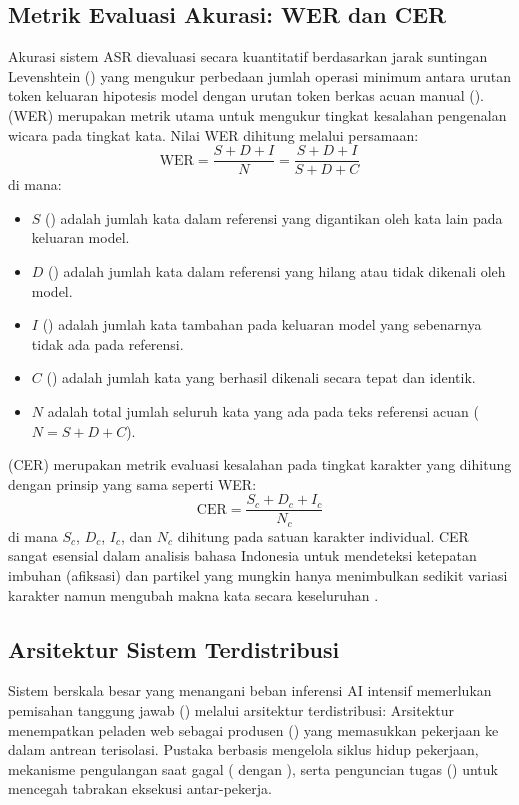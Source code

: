 \subsection{Metrik Evaluasi Akurasi: WER dan CER}
Akurasi sistem ASR dievaluasi secara kuantitatif berdasarkan jarak suntingan Levenshtein () yang mengukur perbedaan jumlah operasi minimum antara urutan token keluaran hipotesis model dengan urutan token berkas acuan manual ().
 (WER) merupakan metrik utama untuk mengukur tingkat kesalahan pengenalan wicara pada tingkat kata. Nilai WER dihitung melalui persamaan:
    \begin{equation}
        \text{WER} = \frac{S + D + I}{N} = \frac{S + D + I}{S + D + C}
    \end{equation}
    di mana:
    \begin{itemize}[leftmargin=1cm]
        \item $S$ () adalah jumlah kata dalam referensi yang digantikan oleh kata lain pada keluaran model.
        \item $D$ () adalah jumlah kata dalam referensi yang hilang atau tidak dikenali oleh model.
        \item $I$ () adalah jumlah kata tambahan pada keluaran model yang sebenarnya tidak ada pada referensi.
        \item $C$ () adalah jumlah kata yang berhasil dikenali secara tepat dan identik.
        \item $N$ adalah total jumlah seluruh kata yang ada pada teks referensi acuan ($N = S + D + C$).
    \end{itemize}
 (CER) merupakan metrik evaluasi kesalahan pada tingkat karakter yang dihitung dengan prinsip yang sama seperti WER:
    \begin{equation}
        \text{CER} = \frac{S_c + D_c + I_c}{N_c}
    \end{equation}
    di mana $S_c$, $D_c$, $I_c$, dan $N_c$ dihitung pada satuan karakter individual. CER sangat esensial dalam analisis bahasa Indonesia untuk mendeteksi ketepatan imbuhan (afiksasi) dan partikel yang mungkin hanya menimbulkan sedikit variasi karakter namun mengubah makna kata secara keseluruhan .
\noindent

\subsection{Arsitektur Sistem Terdistribusi}
Sistem berskala besar yang menangani beban inferensi AI intensif memerlukan pemisahan tanggung jawab () melalui arsitektur terdistribusi:
Arsitektur  menempatkan peladen web sebagai produsen () yang memasukkan pekerjaan ke dalam antrean terisolasi. Pustaka  berbasis  mengelola siklus hidup pekerjaan, mekanisme pengulangan saat gagal ( dengan ), serta penguncian tugas () untuk mencegah tabrakan eksekusi antar-pekerja.

